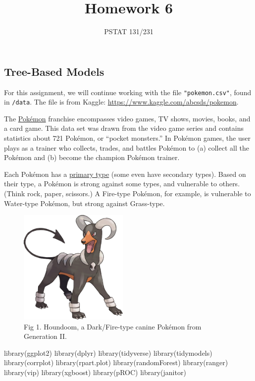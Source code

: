 \documentclass[
]{article}
\title{Homework 6}
\author{PSTAT 131/231}
\date{}
\newenvironment{Shaded}{\begin{snugshade}}{\end{snugshade}}
\newcommand{\FunctionTok}[1]{\textcolor[rgb]{0.00,0.00,0.00}{#1}}
\newcommand{\NormalTok}[1]{#1}
\begin{document}
\maketitle

{
\setcounter{tocdepth}{2}
\tableofcontents
}
\hypertarget{tree-based-models}{%
\subsection{Tree-Based Models}\label{tree-based-models}}

For this assignment, we will continue working with the file
\texttt{"pokemon.csv"}, found in \texttt{/data}. The file is from
Kaggle: \url{https://www.kaggle.com/abcsds/pokemon}.

The \href{https://www.pokemon.com/us/}{Pokémon} franchise encompasses
video games, TV shows, movies, books, and a card game. This data set was
drawn from the video game series and contains statistics about 721
Pokémon, or ``pocket monsters.'' In Pokémon games, the user plays as a
trainer who collects, trades, and battles Pokémon to (a) collect all the
Pokémon and (b) become the champion Pokémon trainer.

Each Pokémon has a
\href{https://bulbapedia.bulbagarden.net/wiki/Type}{primary type} (some
even have secondary types). Based on their type, a Pokémon is strong
against some types, and vulnerable to others. (Think rock, paper,
scissors.) A Fire-type Pokémon, for example, is vulnerable to Water-type
Pokémon, but strong against Grass-type.

\begin{figure}
\centering
\includegraphics[width=2.08333in,height=\textheight]{images/houndoom.jpg}
\caption{Fig 1. Houndoom, a Dark/Fire-type canine Pokémon from
Generation II.}
\end{figure}

\begin{Shaded}
\begin{Highlighting}[]
\FunctionTok{library}\NormalTok{(ggplot2)}
\FunctionTok{library}\NormalTok{(dplyr)}
\FunctionTok{library}\NormalTok{(tidyverse)}
\FunctionTok{library}\NormalTok{(tidymodels)}
\FunctionTok{library}\NormalTok{(corrplot)}
\FunctionTok{library}\NormalTok{(rpart.plot)}
\FunctionTok{library}\NormalTok{(randomForest)}
\FunctionTok{library}\NormalTok{(ranger)}
\FunctionTok{library}\NormalTok{(vip)}
\FunctionTok{library}\NormalTok{(xgboost)}
\FunctionTok{library}\NormalTok{(pROC)}
\FunctionTok{library}\NormalTok{(janitor)}
\end{Highlighting}
\end{Shaded}
\end{document}
